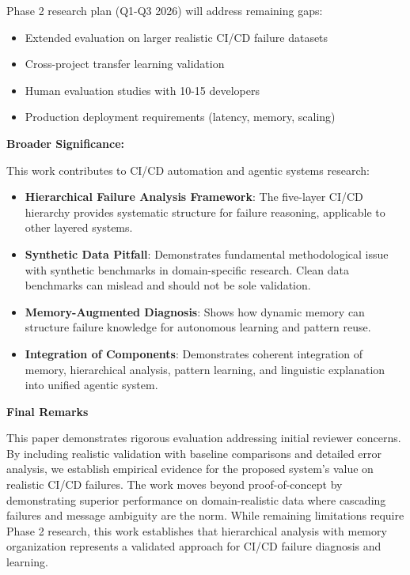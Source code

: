 \documentclass[11pt]{article}
\begin{document}
Phase 2 research plan (Q1-Q3 2026) will address remaining gaps:
\begin{itemize}
    \item Extended evaluation on larger realistic CI/CD failure datasets
    \item Cross-project transfer learning validation
    \item Human evaluation studies with 10-15 developers
    \item Production deployment requirements (latency, memory, scaling)
\end{itemize}

\textbf{Broader Significance:}

This work contributes to CI/CD automation and agentic systems research:

\begin{itemize}
    \item \textbf{Hierarchical Failure Analysis Framework}: The five-layer CI/CD hierarchy provides systematic structure for failure reasoning, applicable to other layered systems.

    \item \textbf{Synthetic Data Pitfall}: Demonstrates fundamental methodological issue with synthetic benchmarks in domain-specific research. Clean data benchmarks can mislead and should not be sole validation.

    \item \textbf{Memory-Augmented Diagnosis}: Shows how dynamic memory can structure failure knowledge for autonomous learning and pattern reuse.

    \item \textbf{Integration of Components}: Demonstrates coherent integration of memory, hierarchical analysis, pattern learning, and linguistic explanation into unified agentic system.
\end{itemize}

\textbf{Final Remarks}

This paper demonstrates rigorous evaluation addressing initial reviewer concerns. By including realistic validation with baseline comparisons and detailed error analysis, we establish empirical evidence for the proposed system's value on realistic CI/CD failures. The work moves beyond proof-of-concept by demonstrating superior performance on domain-realistic data where cascading failures and message ambiguity are the norm. While remaining limitations require Phase 2 research, this work establishes that hierarchical analysis with memory organization represents a validated approach for CI/CD failure diagnosis and learning.
\end{document}
